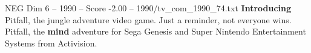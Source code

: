 \begin{textsample}{NEG Dim 6 – 1990 – Score -2.00 – 1990/tv\_com\_1990\_74.txt}  \label{ex:f6_neg_025}
\textbf{Introducing} Pitfall, the jungle adventure video game.
Just a reminder, not everyone wins.
Pitfall, the \textbf{mind} adventure for Sega Genesis and Super Nintendo Entertainment Systems from Activision.

\end{textsample}
